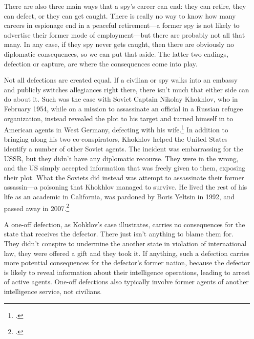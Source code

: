 \documentclass[12pt]{article}
\begin{document}
There are also three main ways that a spy's career can end: they can retire, they can defect, or they can get caught. There is really no way to know how many careers in espionage end in a peaceful retirement---a former spy is not likely to advertise their former mode of employment---but there are probably not all that many. In any case, if they spy never gets caught, then there are obviously no diplomatic consequences, so we can put that aside. The latter two endings, defection or capture, are where the consequences come into play.

Not all defections are created equal. If a civilian or spy walks into an embassy and publicly switches allegiances right there, there isn't much that either side can do about it. Such was the case with Soviet Captain Nikolay Khokhlov, who in February 1954, while on a mission to assassinate an official in a Russian refugee organization, instead revealed the plot to his target and turned himself in to American agents in West Germany, defecting with his wife.\footcite[Captain Khoklov repeatedly emphasized at the press conference that his decision to defect was inspired by his wife Yanina, who told him that ``she would never permit their child to have an assasin as a father.'']{handler_another_1954} In addition to bringing along his two co-conspirators, Khokhlov helped the United States identify a number of other Soviet agents. The incident was embarrassing for the USSR, but they didn't have any diplomatic recourse. They were in the wrong, and the US simply accepted information that was freely given to them, exposing their plot. What the Soviets did instead was attempt to assassinate their former assassin---a poisoning that Khokhlov managed to survive. He lived the rest of his life as an academic in California, was pardoned by Boris Yeltsin in 1992, and passed away in 2007.\footcite[p.~57]{mickolus_counterintelligence_2015}

A one-off defection, as Kohklov's case illustrates, carries no consequences for the state that receives the defector. There just isn't anything to blame them for. They didn't conspire to undermine the another state in violation of international law, they were offered a gift and they took it. If anything, such a defection carries more potential consequences for the defector's former nation, because the defector is likely to reveal information about their intelligence operations, leading to arrest of active agents. One-off defections also typically involve former agents of another intelligence service, not civilians.
\end{document}
